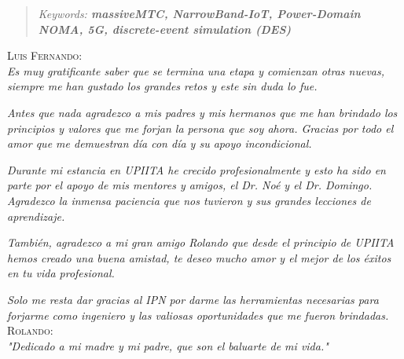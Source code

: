\documentclass[
	12pt, %
	spanish, %
	es-tabla,
	singlespacing, %
	headsepline, %
	]{MastersDoctoralThesis} %
\begin{document}
\begin{abstract}
		\textit{Keywords: \textbf{massiveMTC, NarrowBand-IoT, Power-Domain NOMA, 5G, discrete-event simulation (DES)} }\\ 

\end{abstract}


\begin{acknowledgements}
\addchaptertocentry{\acknowledgementname} %
\textsc{Luis Fernando:} \\

\textit{Es muy gratificante saber que se termina una etapa y comienzan otras nuevas, siempre me han gustado los grandes retos y este sin duda lo fue.}\newline

\textit{Antes que nada agradezco a mis padres y mis hermanos que me han brindado los principios y valores que me forjan la persona que soy ahora. Gracias por todo el amor que me demuestran día con día y su apoyo incondicional.} \newline

\textit{Durante mi estancia en UPIITA he crecido profesionalmente y esto ha sido en parte por el apoyo de mis mentores y amigos, el Dr. Noé y el Dr. Domingo. Agradezco la inmensa paciencia que nos tuvieron y sus grandes lecciones de aprendizaje.} \newline

\textit{También, agradezco a mi gran amigo Rolando que desde el principio de UPIITA hemos creado una buena amistad, te deseo mucho amor y el mejor de los éxitos en tu vida profesional.}\newline

\textit{Solo me resta dar gracias al IPN por darme las herramientas necesarias para forjarme como ingeniero y las valiosas oportunidades que me fueron brindadas.}\newline \\

\textsc{Rolando:}\\

\textit{    "Dedicado a mi madre y mi padre, que son el baluarte de mi vida."}

\end{acknowledgements}
\end{document}
